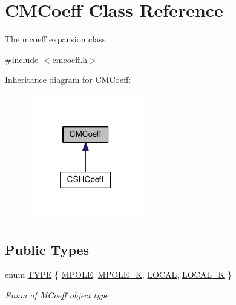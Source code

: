 \hypertarget{classCMCoeff}{\section{C\-M\-Coeff Class Reference}
\label{classCMCoeff}
}


The mcoeff expansion class.  




{\ttfamily \#include $<$cmcoeff.\-h$>$}



Inheritance diagram for C\-M\-Coeff\-:
\nopagebreak
\begin{figure}[H]
\begin{center}
\leavevmode
\includegraphics[width=140pt]{classCMCoeff__inherit__graph}
\end{center}
\end{figure}
\subsection*{Public Types}
\begin{DoxyCompactItemize}
\item 
enum \hyperlink{classCMCoeff_a0b490eeb5ba86bc1a95ea1c3b2946478}{T\-Y\-P\-E} \{ \hyperlink{classCMCoeff_a0b490eeb5ba86bc1a95ea1c3b2946478a44c2e68e32e879f210aab9493a0fb48d}{M\-P\-O\-L\-E}, 
\hyperlink{classCMCoeff_a0b490eeb5ba86bc1a95ea1c3b2946478a7620a298f37501509e3a5fec264f0c4f}{M\-P\-O\-L\-E\-\_\-\-K}, 
\hyperlink{classCMCoeff_a0b490eeb5ba86bc1a95ea1c3b2946478a3a2cae46474f6e8cd2151bb47b11002c}{L\-O\-C\-A\-L}, 
\hyperlink{classCMCoeff_a0b490eeb5ba86bc1a95ea1c3b2946478a518645c07b91ad17f9af6fa00ce5042a}{L\-O\-C\-A\-L\-\_\-\-K}
 \}
\begin{DoxyCompactList}\small\item\em Enum of M\-Coeff object type. \end{DoxyCompactList}\end{DoxyCompactItemize}
